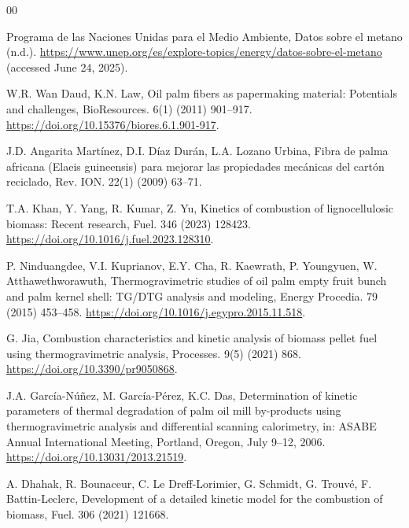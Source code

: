 \documentclass[preprint,12pt]{elsarticle}
\begin{document}
{\begin{thebibliography}{00}

 Programa de las Naciones Unidas para el Medio Ambiente, Datos sobre el metano (n.d.). \href{https://www.unep.org/es/explore-topics/energy/datos-sobre-el-metano}{https://www.unep.org/es/explore-topics/energy/datos-sobre-el-metano} (accessed June 24, 2025).

 W.R. Wan Daud, K.N. Law, Oil palm fibers as papermaking material: Potentials and challenges, BioResources. 6(1) (2011) 901--917. \href{https://doi.org/10.15376/biores.6.1.901-917}{https://doi.org/10.15376/biores.6.1.901-917}.

 J.D. Angarita Martínez, D.I. Díaz Durán, L.A. Lozano Urbina, Fibra de palma africana (Elaeis guineensis) para mejorar las propiedades mecánicas del cartón reciclado, Rev. ION. 22(1) (2009) 63--71.


 T.A. Khan, Y. Yang, R. Kumar, Z. Yu, Kinetics of combustion of lignocellulosic biomass: Recent research, Fuel. 346 (2023) 128423. \href{https://doi.org/10.1016/j.fuel.2023.128310}{https://doi.org/10.1016/j.fuel.2023.128310}.



 P. Ninduangdee, V.I. Kuprianov, E.Y. Cha, R. Kaewrath, P. Youngyuen, W. Atthawethworawuth, Thermogravimetric studies of oil palm empty fruit bunch and palm kernel shell: TG/DTG analysis and modeling, Energy Procedia. 79 (2015) 453--458. \href{https://doi.org/10.1016/j.egypro.2015.11.518}{https://doi.org/10.1016/j.egypro.2015.11.518}.


 G. Jia, Combustion characteristics and kinetic analysis of biomass pellet fuel using thermogravimetric analysis, Processes. 9(5) (2021) 868. \href{https://doi.org/10.3390/pr9050868}{https://doi.org/10.3390/pr9050868}.



 J.A. García-Núñez, M. García-Pérez, K.C. Das, Determination of kinetic parameters of thermal degradation of palm oil mill by-products using thermogravimetric analysis and differential scanning calorimetry, in: ASABE Annual International Meeting, Portland, Oregon, July 9–12, 2006. \href{https://doi.org/10.13031/2013.21519}{https://doi.org/10.13031/2013.21519}.



 A. Dhahak, R. Bounaceur, C. Le Dreff-Lorimier, G. Schmidt, G. Trouvé, F. Battin-Leclerc, Development of a detailed kinetic model for the combustion of biomass, Fuel. 306 (2021) 121668. 




\end{thebibliography}}
\end{document}
